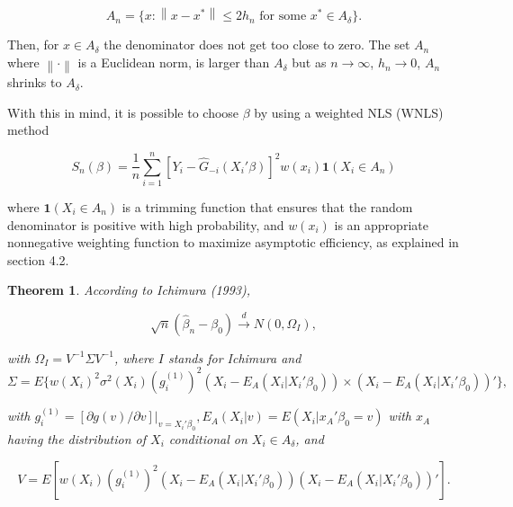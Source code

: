 \documentclass[a4paper]{article}
\newcommand{\norm}[1]{\left\lVert#1\right\rVert}
\begin{document}
\[ A_n = \{ x : \norm{x - x^*} \leq 2h_n \text{ for some } x^* \in A_\delta\}.
\]

Then, for $x \in A_\delta$ the denominator does not get too close to zero. The set $A_n$ where $\norm{\cdot}$ is a Euclidean norm, is larger than $A_\delta$ but as $ n \rightarrow \infty $, $h_n \rightarrow 0$, $A_n$ shrinks to $A_\delta$. 

With this in mind, it is possible to choose $\beta$ by using a weighted NLS (WNLS) method

\begin{equation}
S_n(\beta) = \frac{1}{n} \sum_{i=1}^{n}  [Y_i - \hat{G}_{-i}(X_i'\beta)]^2w(x_i)\mathbf{1}{(X_i \in A_n)}
\end{equation}

where $\mathbf{1}{(X_i \in A_n)}$ is a trimming function that ensures that the random denominator is positive with high probability, and $w(x_i)$ is an appropriate nonnegative weighting function to maximize asymptotic efficiency, as explained in section 4.2. 


\newtheorem{theorem}{Theorem}[section]

\begin{theorem}
According to Ichimura (1993), 

	

\[ \sqrt{n}(\hat{\beta}_n - \beta_0) \stackrel{d}{\rightarrow} N(0,\Omega_I), \] 

 with $\Omega_I = V^{-1}\Sigma V^{-1}$, where $I$ stands for Ichimura and 
\[\Sigma = E\{w(X_i)^2\sigma^2(X_i)(g_i^{(1)})^2(X_i - E_A(X_i|X_i'\beta_0)) \times (X_i - E_A(X_i|X_i'\beta_0))'\},\]

with $g_i^{(1)} = [\partial g(v)/\partial v]|_{v = X_i'\beta_0}, E_A(X_i|v) = E(X_i|x_A'\beta_0 = v)$ with $x_A$ having the distribution of $X_i$ conditional on $X_i \in A_\delta$, and

\[ V = E[w(X_i)(g_i^{(1)})^2(X_i - E_A(X_i|X_i'\beta_0))(X_i - E_A(X_i|X_i'\beta_0))'].\]

\end{theorem}
\end{document}
